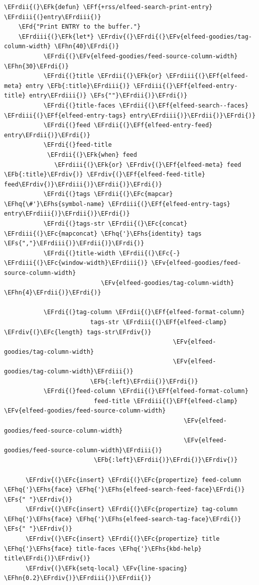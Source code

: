 \documentclass{scrartcl}
\newcommand{\EFk}[1]{\textcolor{EFk}{#1}} %
\newcommand{\EFd}[1]{\textcolor{EFd}{#1}} %
\newcommand{\EFs}[1]{\textcolor{EFs}{#1}} %
\newcommand{\EFb}[1]{\textcolor{EFb}{#1}} %
\newcommand{\EFc}[1]{\textcolor{EFc}{#1}} %
\newcommand{\EFv}[1]{\textcolor{EFv}{#1}} %
\newcommand{\EFf}[1]{\textcolor{EFf}{#1}} %
\newcommand{\EFhn}[1]{#1} %
\newcommand{\EFhq}[1]{#1} %
\newcommand{\EFhs}[1]{#1} %
\newcommand{\EFrdi}[1]{#1} %
\newcommand{\EFrdii}[1]{#1} %
\newcommand{\EFrdiii}[1]{#1} %
\newcommand{\EFrdiv}[1]{#1} %
\begin{document}
\begin{Code}
\begin{Verbatim}[]
  \EFrdii{(}\EFk{defun} \EFf{+rss/elfeed-search-print-entry} \EFrdiii{(}entry\EFrdiii{)}
    \EFd{"Print ENTRY to the buffer."}
    \EFrdiii{(}\EFk{let*} \EFrdiv{(}\EFrdi{(}\EFv{elfeed-goodies/tag-column-width} \EFhn{40}\EFrdi{)}
           \EFrdi{(}\EFv{elfeed-goodies/feed-source-column-width} \EFhn{30}\EFrdi{)}
           \EFrdi{(}title \EFrdii{(}\EFk{or} \EFrdiii{(}\EFf{elfeed-meta} entry \EFb{:title}\EFrdiii{)} \EFrdiii{(}\EFf{elfeed-entry-title} entry\EFrdiii{)} \EFs{""}\EFrdii{)}\EFrdi{)}
           \EFrdi{(}title-faces \EFrdii{(}\EFf{elfeed-search--faces} \EFrdiii{(}\EFf{elfeed-entry-tags} entry\EFrdiii{)}\EFrdii{)}\EFrdi{)}
           \EFrdi{(}feed \EFrdii{(}\EFf{elfeed-entry-feed} entry\EFrdii{)}\EFrdi{)}
           \EFrdi{(}feed-title
            \EFrdii{(}\EFk{when} feed
              \EFrdiii{(}\EFk{or} \EFrdiv{(}\EFf{elfeed-meta} feed \EFb{:title}\EFrdiv{)} \EFrdiv{(}\EFf{elfeed-feed-title} feed\EFrdiv{)}\EFrdiii{)}\EFrdii{)}\EFrdi{)}
           \EFrdi{(}tags \EFrdii{(}\EFc{mapcar} \EFhq{\#'}\EFhs{symbol-name} \EFrdiii{(}\EFf{elfeed-entry-tags} entry\EFrdiii{)}\EFrdii{)}\EFrdi{)}
           \EFrdi{(}tags-str \EFrdii{(}\EFc{concat} \EFrdiii{(}\EFc{mapconcat} \EFhq{'}\EFhs{identity} tags \EFs{","}\EFrdiii{)}\EFrdii{)}\EFrdi{)}
           \EFrdi{(}title-width \EFrdii{(}\EFc{-} \EFrdiii{(}\EFc{window-width}\EFrdiii{)} \EFv{elfeed-goodies/feed-source-column-width}
                           \EFv{elfeed-goodies/tag-column-width} \EFhn{4}\EFrdii{)}\EFrdi{)}

           \EFrdi{(}tag-column \EFrdii{(}\EFf{elfeed-format-column}
                        tags-str \EFrdiii{(}\EFf{elfeed-clamp} \EFrdiv{(}\EFc{length} tags-str\EFrdiv{)}
                                               \EFv{elfeed-goodies/tag-column-width}
                                               \EFv{elfeed-goodies/tag-column-width}\EFrdiii{)}
                        \EFb{:left}\EFrdii{)}\EFrdi{)}
           \EFrdi{(}feed-column \EFrdii{(}\EFf{elfeed-format-column}
                         feed-title \EFrdiii{(}\EFf{elfeed-clamp} \EFv{elfeed-goodies/feed-source-column-width}
                                                  \EFv{elfeed-goodies/feed-source-column-width}
                                                  \EFv{elfeed-goodies/feed-source-column-width}\EFrdiii{)}
                         \EFb{:left}\EFrdii{)}\EFrdi{)}\EFrdiv{)}

      \EFrdiv{(}\EFc{insert} \EFrdi{(}\EFc{propertize} feed-column \EFhq{'}\EFhs{face} \EFhq{'}\EFhs{elfeed-search-feed-face}\EFrdi{)} \EFs{" "}\EFrdiv{)}
      \EFrdiv{(}\EFc{insert} \EFrdi{(}\EFc{propertize} tag-column \EFhq{'}\EFhs{face} \EFhq{'}\EFhs{elfeed-search-tag-face}\EFrdi{)} \EFs{" "}\EFrdiv{)}
      \EFrdiv{(}\EFc{insert} \EFrdi{(}\EFc{propertize} title \EFhq{'}\EFhs{face} title-faces \EFhq{'}\EFhs{kbd-help} title\EFrdi{)}\EFrdiv{)}
      \EFrdiv{(}\EFk{setq-local} \EFv{line-spacing} \EFhn{0.2}\EFrdiv{)}\EFrdiii{)}\EFrdii{)}


\end{Verbatim}
\end{Code}
\end{document}
